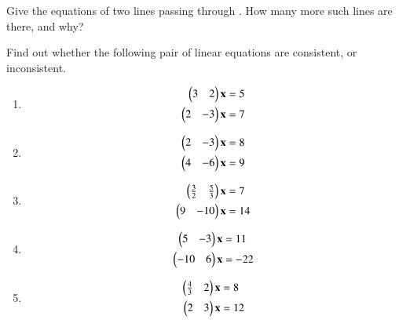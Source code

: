 %
\item Give the equations of two lines passing through . How many more such lines are there, and why?
\item Find out whether the following pair of linear
equations are consistent, or inconsistent.
%
\begin{enumerate}[itemsep=2pt]
\item
\begin{align}
\begin{split}
\begin{pmatrix}3 & 2 \end{pmatrix}\mathbf{x}&=5
\\
\begin{pmatrix}2 & -3 \end{pmatrix}\mathbf{x}&=7
\end{split}
\end{align}
\item
\begin{align}
\begin{split}
\begin{pmatrix}2 & -3 \end{pmatrix}\mathbf{x}&=8
\\
\begin{pmatrix}4 & -6 \end{pmatrix}\mathbf{x}&=9
\end{split}
\end{align}
\item
\begin{align}
\begin{split}
\begin{pmatrix}\frac{3}{2} & \frac{5}{3} \end{pmatrix}\mathbf{x}&=7
\\
\begin{pmatrix}9 & -10 \end{pmatrix}\mathbf{x}&=14
\end{split}
\end{align}
\item
\begin{align}
\begin{split}
\begin{pmatrix}5 & -3 \end{pmatrix}\mathbf{x}&=11
\\
\begin{pmatrix}-10 & 6 \end{pmatrix}\mathbf{x}&=-22
\end{split}
\end{align}
\item
\begin{align}
\begin{split}
\begin{pmatrix}\frac{4}{3} & 2 \end{pmatrix}\mathbf{x}&=8
\\
\begin{pmatrix}2 & 3 \end{pmatrix}\mathbf{x}&=12
\end{split}
\end{align}
\end{enumerate}
%
%



